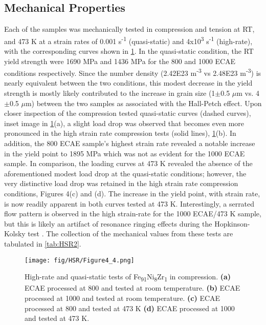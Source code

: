 	\subsection*{Mechanical Properties}
		Each of the samples was mechanically tested in compression and tension at RT, and 473 K at a strain rates of 0.001 s\textsuperscript{-1} (quasi-static) and 4x10\textsuperscript{3} s\textsuperscript{-1} (high-rate), with the corresponding curves shown in \ref{fig:HSR4}. In the quasi-static condition, the RT yield strength were 1690 MPa and 1436 MPa for the 800 \celsius{}   and 1000 \celsius{}   ECAE conditions respectively. Since the number density (2.42E23 m\textsuperscript{-3} vs 2.48E23 m\textsuperscript{-3}) is nearly equivalent between the two conditions, this modest decrease in the yield strength is mostly likely contributed to the increase in grain size (1$\pm{}$0.5 $\mu$m vs. 4$\pm{}${}0.5 $\mu$m) between the two samples as associated with the Hall-Petch effect. Upon closer inspection of the compression tested quasi-static curves (dashed curves), inset image in \ref{fig:HSR4}(a), a slight load drop was observed that becomes even more pronounced in the high strain rate compression tests (solid lines), \ref{fig:HSR4}(b). In addition, the 800 \celsius{}   ECAE sample’s highest strain rate revealed a notable increase in the yield point to 1895 MPa which was not as evident for the 1000 \celsius{} ECAE sample. In comparison, the loading curves at 473 K revealed the absence of the aforementioned modest load drop at the quasi-static conditions; however, the very distinctive load drop was retained in the high strain rate compression conditions, Figures 4(c) and (d). The increase in the yield point, with strain rate, is now readily apparent in both curves tested at 473 K. Interestingly, a serrated flow pattern is observed in the high strain-rate for the 1000 \celsius{} ECAE/473 K sample, but this is likely an artifact of resonance ringing effects during the Hopkinson-Kolsky test \cite{RN1372}. The collection of the mechanical values from these tests are tabulated in \ref{tab:HSR2}.
		 
		\begin{figure}
			\centering
			\texttt{[image: fig/HSR/Figure4\_4.png]}
			\caption[High-rate and quasi-static tests of Fe\textsubscript{91}Ni\textsubscript{8}Zr\textsubscript{1 } in compression.]{High-rate and quasi-static tests of Fe\textsubscript{91}Ni\textsubscript{8}Zr\textsubscript{1 } in compression. \textbf{(a)} ECAE processed at 800 \celsius{} and tested at room temperature. \textbf{(b)} ECAE processed at 1000 \celsius{}
				and tested at room temperature. \textbf{(c)} ECAE processed at 800 \celsius{} and tested at 473 K \textbf{(d)} ECAE processed at 1000 \celsius{} and tested at 473 K.}
			\label{fig:HSR4}
		\end{figure} 
		 
